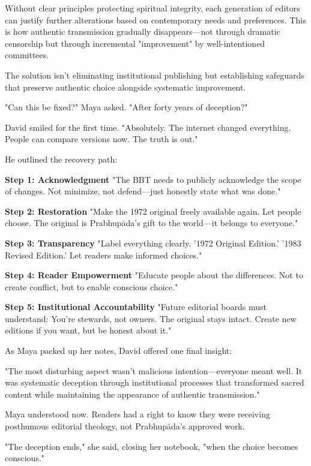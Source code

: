 \documentclass[12pt,twoside]{book}
\begin{document}
Without clear principles protecting spiritual integrity, each generation of editors can justify further alterations based on contemporary needs and preferences. This is how authentic transmission gradually disappears—not through dramatic censorship but through incremental "improvement" by well-intentioned committees.

The solution isn't eliminating institutional publishing but establishing safeguards that preserve authentic choice alongside systematic improvement.

"Can this be fixed?" Maya asked. "After forty years of deception?"

David smiled for the first time. "Absolutely. The internet changed everything. People can compare versions now. The truth is out."

He outlined the recovery path:

\textbf{\textbf{Step 1: Acknowledgment}}
"The BBT needs to publicly acknowledge the scope of changes. Not minimize, not defend—just honestly state what was done."

\textbf{\textbf{Step 2: Restoration}}
"Make the 1972 original freely available again. Let people choose. The original is Prabhupāda's gift to the world—it belongs to everyone."

\textbf{\textbf{Step 3: Transparency}}
"Label everything clearly. '1972 Original Edition.' '1983 Revised Edition.' Let readers make informed choices."

\textbf{\textbf{Step 4: Reader Empowerment}}
"Educate people about the differences. Not to create conflict, but to enable conscious choice."

\textbf{\textbf{Step 5: Institutional Accountability}}
"Future editorial boards must understand: You're stewards, not owners. The original stays intact. Create new editions if you want, but be honest about it."

As Maya packed up her notes, David offered one final insight:

"The most disturbing aspect wasn't malicious intention—everyone meant well. It was systematic deception through institutional processes that transformed sacred content while maintaining the appearance of authentic transmission."

Maya understood now. Readers had a right to know they were receiving posthumous editorial theology, not Prabhupāda's approved work.

"The deception ends," she said, closing her notebook, "when the choice becomes conscious."
\end{document}
